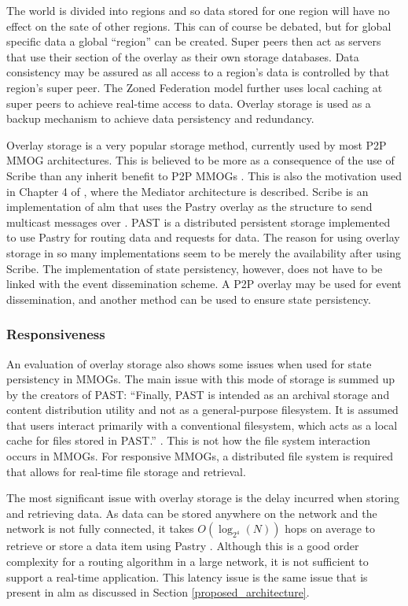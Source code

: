 \documentclass[journal,oneside,a4paper,onecolumn]{IEEEtran}
\begin{document}
The world is divided into regions and so data stored for one region will have no effect on the sate of other regions. This can of course be debated, but for global specific data a global ``region'' can be created. Super peers then act as servers that use their section of the overlay as their own storage databases. Data consistency may be assured as all access to a region's data is controlled by that region's super peer. The Zoned Federation model further uses local caching at super peers to achieve real-time access to data. Overlay storage is used as a backup mechanism to achieve data persistency and redundancy.

Overlay storage is a very popular storage method, currently used by most P2P MMOG architectures. This is believed to be more as a consequence of the use of Scribe than any inherit benefit to P2P MMOGs \cite{past_storage_focus}. This is also the motivation used in Chapter 4 of \cite{Fan_phd}, where the Mediator architecture is described. Scribe is an implementation of \ac{alm} that uses the Pastry overlay as the structure to send multicast messages over \cite{scribe}. PAST is a distributed persistent storage implemented to use Pastry for routing data and requests for data. The reason for using overlay storage in so many implementations seem to be merely the availability after using Scribe. The implementation of state persistency, however, does not have to be linked with the event dissemination scheme. A P2P overlay may be used for event dissemination, and another method can be used to ensure state persistency.

\subsubsection{Responsiveness}
An evaluation of overlay storage also shows some issues when used for state persistency in MMOGs. The main issue with this mode of storage is summed up by the creators of PAST: ``Finally, PAST is intended as an archival storage and content distribution utility and not as a general-purpose filesystem. It is assumed that users interact primarily with a conventional filesystem, which acts as a local cache for files stored in PAST.'' \cite{storage_and_chaching_PAST}. This is not how the file system interaction occurs in MMOGs. For responsive MMOGs, a distributed file system is required that allows for real-time file storage and retrieval.

The most significant issue with overlay storage is the delay incurred when storing and retrieving data. As data can be stored anywhere on the network and the network is not fully connected, it takes $O(\log_{2^4}(N))$ hops on average to retrieve or store a data item using Pastry \cite{storage_and_chaching_PAST}. Although this is a good order complexity for a routing algorithm in a large network, it is not sufficient to support a real-time application. This latency issue is the same issue that is present in \ac{alm} as discussed in Section \ref{proposed_architecture}.
\end{document}
